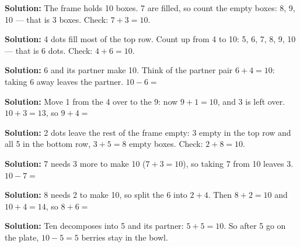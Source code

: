 \documentclass[12pt]{article}
\begin{document}




\textbf{Solution:} The frame holds 10 boxes. 7 are filled, so count the empty
boxes: 8, 9, 10 --- that is 3 boxes. Check: $7+3=10$. 


\textbf{Solution:} 4 dots fill most of the top row. Count up from 4 to 10:
5, 6, 7, 8, 9, 10 --- that is 6 dots. Check: $4+6=10$. 


\textbf{Solution:} 6 and its partner make 10. Think of the partner pair
$6+4=10$: taking 6 away leaves the partner. $10-6=\;$


\textbf{Solution:} Move 1 from the 4 over to the 9: now $9+1=10$, and 3 is
left over. $10+3=13$, so $9+4=\;$


\textbf{Solution:} 2 dots leave the rest of the frame empty: 3 empty in the
top row and all 5 in the bottom row, $3+5=8$ empty boxes. Check: $2+8=10$.


\textbf{Solution:} 7 needs 3 more to make 10 ($7+3=10$), so taking 7 from 10
leaves 3. $10-7=\;$


\textbf{Solution:} 8 needs 2 to make 10, so split the 6 into $2+4$. Then
$8+2=10$ and $10+4=14$, so $8+6=\;$


\textbf{Solution:} Ten decomposes into 5 and its partner: $5+5=10$. So after
5 go on the plate, $10-5=5$ berries stay in the bowl. 
\end{document}
